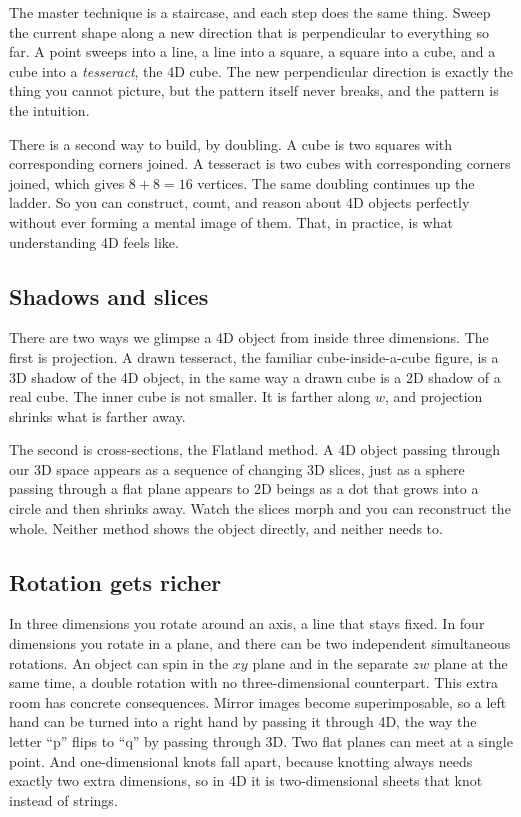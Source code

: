 The master technique is a staircase, and each step does the same thing. Sweep the current shape along a new direction that is perpendicular to everything so far. A point sweeps into a line, a line into a square, a square into a cube, and a cube into a \emph{tesseract}, the 4D cube. The new perpendicular direction is exactly the thing you cannot picture, but the pattern itself never breaks, and the pattern is the intuition.

There is a second way to build, by doubling. A cube is two squares with corresponding corners joined. A tesseract is two cubes with corresponding corners joined, which gives $8 + 8 = 16$ vertices. The same doubling continues up the ladder. So you can construct, count, and reason about 4D objects perfectly without ever forming a mental image of them. That, in practice, is what understanding 4D feels like.

\subsection{Shadows and slices}

There are two ways we glimpse a 4D object from inside three dimensions. The first is projection. A drawn tesseract, the familiar cube-inside-a-cube figure, is a 3D shadow of the 4D object, in the same way a drawn cube is a 2D shadow of a real cube. The inner cube is not smaller. It is farther along $w$, and projection shrinks what is farther away.

The second is cross-sections, the Flatland method. A 4D object passing through our 3D space appears as a sequence of changing 3D slices, just as a sphere passing through a flat plane appears to 2D beings as a dot that grows into a circle and then shrinks away. Watch the slices morph and you can reconstruct the whole. Neither method shows the object directly, and neither needs to.

\subsection{Rotation gets richer}

In three dimensions you rotate around an axis, a line that stays fixed. In four dimensions you rotate in a plane, and there can be two independent simultaneous rotations. An object can spin in the $xy$ plane and in the separate $zw$ plane at the same time, a double rotation with no three-dimensional counterpart. This extra room has concrete consequences. Mirror images become superimposable, so a left hand can be turned into a right hand by passing it through 4D, the way the letter ``p'' flips to ``q'' by passing through 3D. Two flat planes can meet at a single point. And one-dimensional knots fall apart, because knotting always needs exactly two extra dimensions, so in 4D it is two-dimensional sheets that knot instead of strings.

